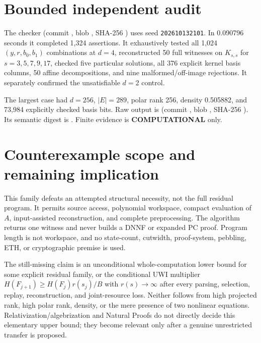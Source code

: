 \documentclass[11pt]{article}
\newcommand{\COMP}{\textbf{COMPUTATIONAL}}
\begin{document}
\section{Bounded independent audit}
The checker
(commit , blob
, SHA-256
)
uses seed \texttt{202610132101}.  In 0.090796 seconds it completed 1,324
assertions.  It exhaustively tested all 1,024 $(y,r,b_0,b_1)$ combinations at
$d=4$, reconstructed 50 full witnesses on $K_{s,s}$ for
$s=3,5,7,9,17$, checked five particular solutions, all 376 explicit kernel
basis columns, 50 affine decompositions, and nine malformed/off-image
rejections.  It separately confirmed the unsatisfiable $d=2$ control.

The largest case had $d=256$, $|E|=289$, polar rank 256, density
0.505882, and 73,984 explicitly checked basis bits.  Raw output is
(commit , blob
, SHA-256
).
Its semantic digest is
.
Finite evidence is \COMP{} only.

\section{Counterexample scope and remaining implication}
This family defeats an attempted structural necessity, not the full residual
program.  It permits source access, polynomial workspace, compact evaluation
of $A$, input-assisted reconstruction, and complete preprocessing.  The
algorithm returns one witness and never builds a DNNF or expanded PC proof.
Program length is not workspace, and no state-count, cutwidth, proof-system,
pebbling, ETH, or cryptographic premise is used.

The still-missing claim is an unconditional whole-computation lower bound for
some explicit residual family, or the conditional UWI multiplier
$H(F_{j+1})\ge H(F_j)r(s_j)/B$ with $r(s)\to\infty$ after every parsing,
selection, replay, reconstruction, and joint-resource loss.  Neither follows
from high projected rank, high polar rank, density, or the mere presence of
two nonlinear equations.  Relativization/algebrization and Natural Proofs do
not directly decide this elementary upper bound; they become relevant only
after a genuine unrestricted transfer is proposed.
\end{document}
